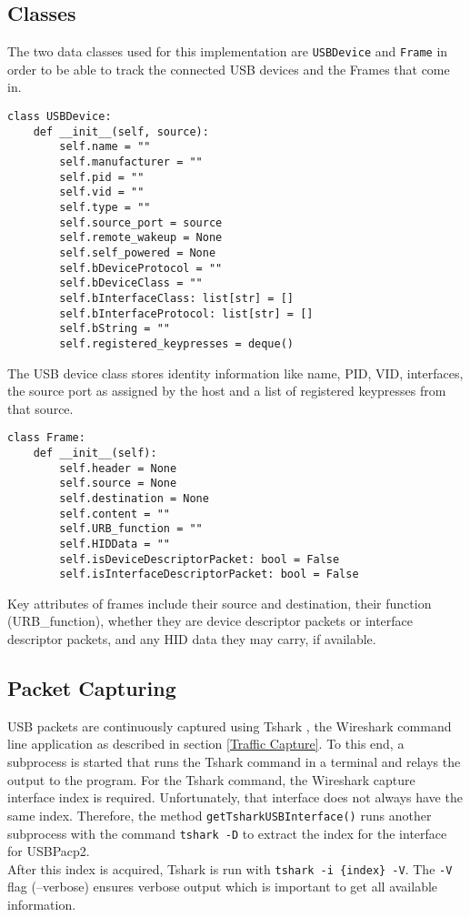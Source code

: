 \subsection{Classes}

The two data classes used for this implementation are \verb|USBDevice| and \verb|Frame| in order to be able to track the connected USB devices and the Frames that come in.

\begin{lstlisting}[caption={USBDevice class definition},captionpos=b]
class USBDevice:
    def __init__(self, source):
        self.name = ""
        self.manufacturer = ""
        self.pid = ""
        self.vid = ""
        self.type = ""
        self.source_port = source
        self.remote_wakeup = None
        self.self_powered = None
        self.bDeviceProtocol = ""
        self.bDeviceClass = ""
        self.bInterfaceClass: list[str] = []
        self.bInterfaceProtocol: list[str] = []
        self.bString = ""
        self.registered_keypresses = deque()
\end{lstlisting}

The USB device class stores identity information like name, PID, VID, interfaces, the source port as assigned by the host and a list of registered keypresses from that source.

\begin{lstlisting}[caption={Frame class definition},captionpos=b]
class Frame:
    def __init__(self):
        self.header = None
        self.source = None
        self.destination = None
        self.content = ""
        self.URB_function = ""
        self.HIDData = ""
        self.isDeviceDescriptorPacket: bool = False
        self.isInterfaceDescriptorPacket: bool = False
\end{lstlisting}

Key attributes of frames include their source and destination, their function (URB\_function), whether they are device descriptor packets or interface descriptor packets, and any HID data they may carry, if available.


\subsection{Packet Capturing}

USB packets are continuously captured using Tshark \cite{TsharkTsharkDev}, the Wireshark command line application as described in section \ref{Traffic Capture}. To this end, a subprocess is started that runs the Tshark command in a terminal and relays the output to the program.
For the Tshark command, the Wireshark capture interface index is required. Unfortunately, that interface does not always have the same index. Therefore, the method \verb|getTsharkUSBInterface()| runs another subprocess with the command \verb|tshark -D| to extract the index for the interface for USBPacp2.  \\
After this index is acquired, Tshark is run with \verb|tshark -i {index} -V|. The \verb|-V| flag (--verbose) ensures verbose output which is important to get all available information.  


